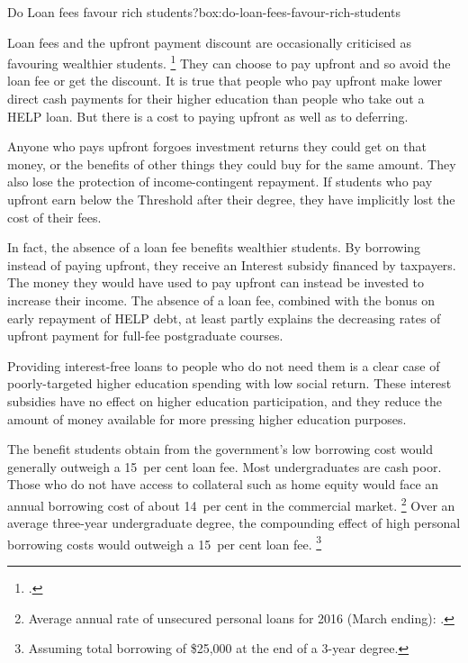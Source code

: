 \documentclass[embargoed]{grattan}
\begin{document}
\begin{smallbox}{Do \gls{Loan fees} favour rich students?}{box:do-loan-fees-favour-rich-students}

\Gls{Loan fees} and the upfront payment discount are occasionally criticised as favouring wealthier students.%
\footcites{Hare-2015-loan-fees-advantage-the-rich}{Evans2011MediareleaseGillard} %
They can choose to pay upfront and so avoid the loan fee or get the discount.
It is true that people who pay upfront make lower direct cash payments for their higher education than people who take out a \gls{HELP} loan.
But there is a cost to paying upfront as well as to deferring.

Anyone who pays upfront forgoes investment returns they could get on that money, or the benefits of other things they could buy for the same amount.
They also lose the protection of income-contingent repayment.
If students who pay upfront earn below the \gls{Threshold} after their degree, they have implicitly lost the cost of their fees.

In fact, the absence of a loan fee benefits wealthier students.
By borrowing instead of paying upfront, they receive an \gls{Interest subsidy} financed by taxpayers.
The money they would have used to pay upfront can instead be invested to increase their income.
The absence of a loan fee, combined with the bonus on early repayment of \gls{HELP} debt, at least partly explains the decreasing rates of upfront payment for full-fee postgraduate courses.

Providing interest-free loans to people who do not need them is a clear case of poorly-targeted higher education spending with low social return.
These interest subsidies have no effect on higher education participation, and they reduce the amount of money available for more pressing higher education purposes.
\end{smallbox}

The benefit students obtain from the government's low borrowing cost would generally outweigh a 15~per cent loan fee.
Most undergraduates are cash poor.
Those who do not have access to collateral such as home equity would face an annual borrowing cost of about 14~per cent in the commercial market.%
\footnote{Average annual rate of unsecured personal loans for 2016 (March ending): \textcite{RBA2016F5Indicatorlending}.} Over an average three-year undergraduate degree, the compounding effect of high personal borrowing costs would outweigh a 15~per cent loan fee.%
\footnote{Assuming total borrowing of \$25,000 at the end of a 3-year degree.} \CenturyFootnote
\end{document}
